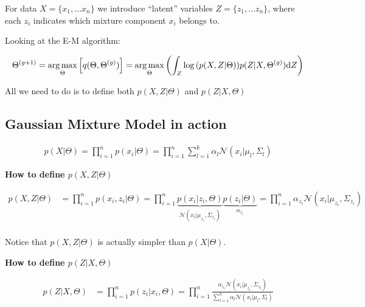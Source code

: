 \documentclass{article}
\def\d{\text{d}}
\begin{document}
For data $X = \{x_1, \dots x_n\}$ we introduce ``latent'' variables $Z = \{ z_1, \dots z_n\}$, where each $z_i$ indicates which mixture component $x_i$ belongs to.

Looking at the E-M algorithm:

\begin{equation}
\begin{split}
\Theta^{(g+1)} = \argmax_{\Theta} \left[ q(\Theta, \Theta^{(g)}) \right]= \argmax_{\Theta} \left( \int_Z \log{(p(X,Z|\Theta))} p(Z|X,\Theta^{(g)}) \d Z \right)
\end{split}
\end{equation}

All we need to do is to define both $p(X,Z|\Theta)$ and $p(Z|X,\Theta)$ 




\subsection{Gaussian Mixture Model in action}


\begin{equation}
\begin{split}
p(X|\Theta) =  \prod_{i=1}^n p(x_i|\Theta) = \prod_{i=1}^n \sum_{l=1}^k \alpha_l \mathcal{N} (x_i | \mu_l, \Sigma_l)
\end{split}
\end{equation}

{\bf How to define $p(X,Z|\Theta)$}  

\begin{equation}
\begin{split}
p(X,Z|\Theta) &= \prod_{i=1}^{n} p(x_i, z_i | \Theta) = \prod_{i=1}^{n} \underbrace{p(x_i | z_i , \Theta)}_{\mathcal{N}(x_i | \mu_{z_i}, \Sigma_{z_i} )} \underbrace{p ( z_i | \Theta)}_{\alpha_{z_i}}
= \prod_{i=1}^{n} \alpha_{z_i} \mathcal{N}(x_i | \mu_{z_i}, \Sigma_{z_i} )\\
\end{split}
\end{equation}

Notice that $p(X,Z|\Theta)$ is actually simpler than $p(X|\Theta)$.

\vspace{5 mm}

{\bf How to define $p(Z|X,\Theta)$}  

\begin{equation}
\begin{split}
p(Z|X,\Theta) &= \prod_{i=1}^{n} p(z_i | x_i , \Theta) = \prod_{i=1}^{n} \frac{\alpha_{z_i} \mathcal{N}(x_i | \mu_{z_i}, \Sigma_{z_i} )}{\sum_{l=1}^k \alpha_{l} \mathcal{N}(x_i | \mu_{l}, \Sigma_{l} )}\\
\end{split}
\end{equation}
\end{document}
